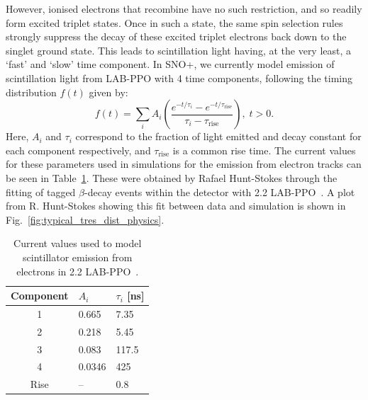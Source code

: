 However, ionised electrons that recombine have no such restriction, and so readily form excited triplet states. Once in such a state, the same spin selection rules strongly suppress the decay of these excited triplet electrons back down to the singlet ground state. This leads to scintillation light having, at the very least, a `fast' and `slow' time component. In SNO+, we currently model emission of scintillation light from LAB-PPO with 4 time components, following the timing distribution $f(t)$ given by:
\begin{equation}
    f(t) = \sum_{i}A_{i}\left(\frac{e^{-t/\tau_{i}}-e^{-t/\tau_{\mathrm{rise}}}}{\tau_{i}-\tau_\mathrm{rise}}\right),\; t > 0.
\end{equation}
Here, $A_{i}$ and $\tau_{i}$ correspond to the fraction of light emitted and decay constant for each component respectively, and $\tau_\mathrm{rise}$ is a common rise time. The current values for these parameters used in simulations for the emission from electron tracks can be seen in Table~\ref{tab:scint_reem_params}. These were obtained by Rafael Hunt-Stokes through the fitting of tagged  $\beta$-decay events within the detector with \SI{2.2}{\gpl} LAB-PPO~\cite{hunt-stokesEmissionTimingTuning2022}. A plot from R. Hunt-Stokes showing this fit between data and simulation is shown in Fig.~\ref{fig:typical_tres_dist_physics}.

\begin{table}[!th]
    \centering
    \begin{tabular}{c p{2cm} p{2cm}}
        \hline
        Component & $A_{i}$ & $\tau_{i}$ [ns] \\ \hline \hline
        1         & 0.665   & 7.35  \\
        2         & 0.218   & 5.45  \\
        3         & 0.083   & 117.5 \\
        4         & 0.0346  & 425   \\
        Rise      & --      & 0.8   \\
        \hline
    \end{tabular}
    \caption[Current values used to model scintillator emission from electrons in \SI{2.2}{\gpl} LAB-PPO]
    {Current values used to model scintillator emission from electrons in \SI{2.2}{\gpl} LAB-PPO~\cite{latorreNewMeasurementsTiming2016,hunt-stokesEmissionTimingTuning2022}.}
    \label{tab:scint_reem_params}
\end{table}

